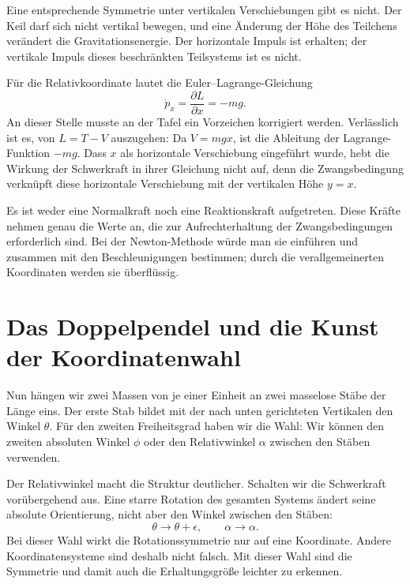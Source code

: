 Eine entsprechende Symmetrie unter vertikalen Verschiebungen gibt es nicht. Der Keil darf sich nicht vertikal bewegen, und eine Änderung der Höhe des Teilchens verändert die Gravitationsenergie. Der horizontale Impuls ist erhalten; der vertikale Impuls dieses beschränkten Teilsystems ist es nicht.

Für die Relativkoordinate lautet die Euler--Lagrange-Gleichung
\begin{equation}
  \dot p_x=\frac{\partial L}{\partial x}=-mg.
  \label{eq:l6-wedge-force}
\end{equation}
An dieser Stelle musste an der Tafel ein Vorzeichen korrigiert werden. Verlässlich ist es, von \(L=T-V\) auszugehen: Da \(V=mgx\), ist die Ableitung der Lagrange-Funktion \(-mg\). Dass \(x\) als horizontale Verschiebung eingeführt wurde, hebt die Wirkung der Schwerkraft in ihrer Gleichung nicht auf, denn die Zwangsbedingung verknüpft diese horizontale Verschiebung mit der vertikalen Höhe \(y=x\).

Es ist weder eine Normalkraft noch eine Reaktionskraft aufgetreten. Diese Kräfte nehmen genau die Werte an, die zur Aufrechterhaltung der Zwangsbedingungen erforderlich sind. Bei der Newton-Methode würde man sie einführen und zusammen mit den Beschleunigungen bestimmen; durch die verallgemeinerten Koordinaten werden sie überflüssig.

\section{Das Doppelpendel und die Kunst der Koordinatenwahl}

Nun hängen wir zwei Massen von je einer Einheit an zwei masselose Stäbe der Länge eins. Der erste Stab bildet mit der nach unten gerichteten Vertikalen den Winkel \(\theta\). Für den zweiten Freiheitsgrad haben wir die Wahl: Wir können den zweiten absoluten Winkel \(\phi\) oder den Relativwinkel \(\alpha\) zwischen den Stäben verwenden.

Der Relativwinkel macht die Struktur deutlicher. Schalten wir die Schwerkraft vorübergehend aus. Eine starre Rotation des gesamten Systems ändert seine absolute Orientierung, nicht aber den Winkel zwischen den Stäben:
\begin{equation}
  \theta\longrightarrow\theta+\epsilon,
  \qquad
  \alpha\longrightarrow\alpha.
  \label{eq:l6-double-rotation}
\end{equation}
Bei dieser Wahl wirkt die Rotationssymmetrie nur auf eine Koordinate. Andere Koordinatensysteme sind deshalb nicht falsch. Mit dieser Wahl sind die Symmetrie und damit auch die Erhaltungsgröße leichter zu erkennen.

